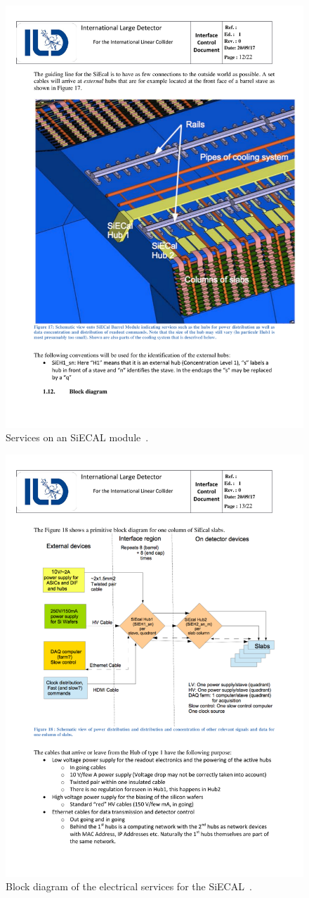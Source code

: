 \begin{figure}[h!]
    \centering
        \includegraphics[width=0.6\hsize]{Integration/fig/SiECAL_Services.pdf}
    \caption{Services on an SiECAL module~\cite{ild:bib:SiECAL_ICD}.}
    \label{ILD:fig:siecal_services}
\end{figure}

\begin{figure}[h!]
    \centering
        \includegraphics[width=0.8\hsize]{Integration/fig/SiECAL_Block_Diagram.pdf}
    \caption{Block diagram of the electrical services for the SiECAL~\cite{ild:bib:SiECAL_ICD}.}
    \label{ILD:fig:siecal_block_diagram}
\end{figure}

